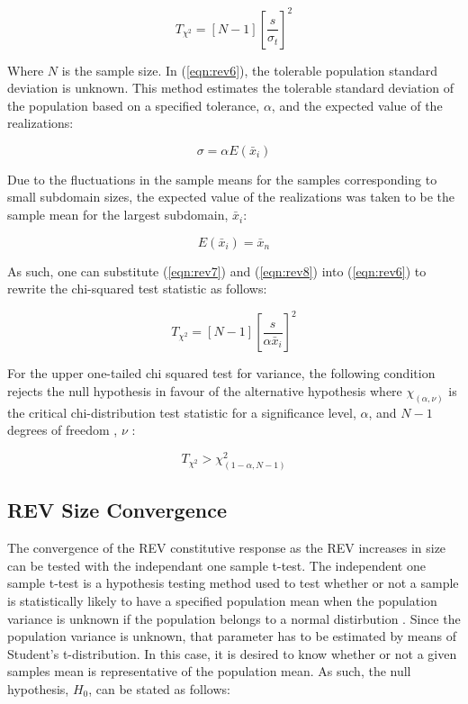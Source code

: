 \begin{equation}
T_{\chi^2}=\left[N-1\right]\left[\frac{s}{\sigma_t}\right]^2
\label{eqn:rev6}
\end{equation}

Where $N$ is the sample size. In (\ref{eqn:rev6}), the tolerable population standard deviation is unknown. This method estimates the tolerable standard deviation of the population based on a specified tolerance, $\alpha$, and the expected value of the realizations:

\begin{equation}
\sigma=\alpha E\left(\bar{x}_i\right)
\label{eqn:rev7}
\end{equation}

Due to the fluctuations in the sample means for the samples corresponding to small subdomain sizes, the expected value of the realizations was taken to be the sample mean for the largest subdomain, $\bar{x}_i$:

\begin{equation}
E\left(\bar{x}_i\right) = \bar{x}_n
\label{eqn:rev8}
\end{equation}

As such, one can substitute (\ref{eqn:rev7}) and (\ref{eqn:rev8}) into (\ref{eqn:rev6}) to rewrite the chi-squared test statistic as follows:

\begin{equation}
T_{\chi^2}=\left[N-1\right]\left[\frac{s}{\alpha \bar{x}_i}\right]^2
\label{eqn:rev9}
\end{equation}

For the upper one-tailed chi squared test for variance, the following condition rejects the null hypothesis in favour of the alternative hypothesis where $\chi_{\left(\alpha, \nu\right)}$ is the critical chi-distribution test statistic for a significance level, $\alpha$, and $N-1$ degrees of freedom , $\nu$ \citep{walpole_probability_2007}:

\begin{equation}
T_{\chi^2}>\chi^2_{\left(1-\alpha, N-1\right)}
\label{eqn:rev10}
\end{equation}

\subsection{REV Size Convergence}

The convergence of the REV constitutive response as the REV increases in size can be tested with the independant one sample t-test. The independent one sample t-test is a hypothesis testing method used to test whether or not a sample is statistically likely to have a specified population mean when the population variance is unknown if the population belongs to a normal distirbution \citep{walpole_probability_2007}. Since the population variance is unknown, that parameter has to be estimated by means of Student’s t-distribution. In this case, it is desired to know whether or not a given samples mean is representative of the population mean. As such, the null hypothesis, $H_0$, can be stated as follows:

